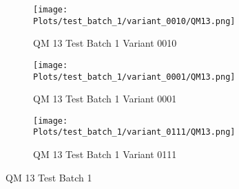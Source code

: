 \documentclass{DissertateFigs}
\begin{document}
\begin{figure}[t!]
\medskip

    \begin{subfigure}{0.47\textwidth}
    \texttt{[image: Plots/test\_batch\_1/variant\_0010/QM13.png]}
    \caption{QM 13 Test Batch 1 Variant 0010}
    \end{subfigure}
    \begin{subfigure}{0.47\textwidth}
    \texttt{[image: Plots/test\_batch\_1/variant\_0001/QM13.png]}
    \caption{QM 13 Test Batch 1 Variant 0001}
    \end{subfigure}

\medskip

    \begin{subfigure}{0.47\textwidth}
    \texttt{[image: Plots/test\_batch\_1/variant\_0111/QM13.png]}
    \caption{QM 13 Test Batch 1 Variant 0111}
    \end{subfigure}
\caption{QM 13 Test Batch 1}
    \end{figure}
\clearpage
\end{document}
